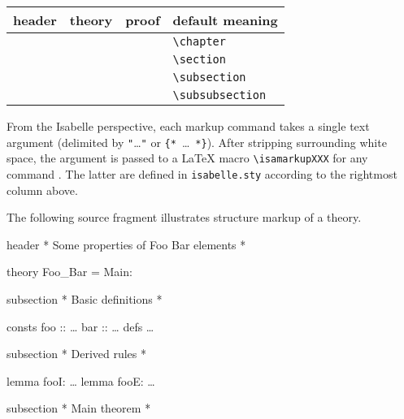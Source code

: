 \begin{isabellebody}
\begin{isamarkuptext}
  \begin{tabular}{llll}
  header & theory & proof & default meaning \\\hline
    & \commdx{chapter} & & \verb,\chapter, \\
  \commdx{header} & \commdx{section} & \commdx{sect} & \verb,\section, \\
    & \commdx{subsection} & \commdx{subsect} & \verb,\subsection, \\
    & \commdx{subsubsection} & \commdx{subsubsect} & \verb,\subsubsection, \\
  \end{tabular}

  \medskip

  From the Isabelle perspective, each markup command takes a single
  text argument (delimited by \verb,",\dots\verb,", or
  \verb,{,\verb,*,~\dots~\verb,*,\verb,},).  After stripping
  surrounding white space, the argument is passed to a {\LaTeX} macro
  \verb,\isamarkupXXX, for any command .  The latter
  are defined in \verb,isabelle.sty, according to the rightmost column
  above.

  \medskip The following source fragment illustrates structure markup
  of a theory.

  \begin{ttbox}
  header {\ttlbrace}* Some properties of Foo Bar elements *{\ttrbrace}

  theory Foo_Bar = Main:

  subsection {\ttlbrace}* Basic definitions *{\ttrbrace}

  consts
    foo :: \dots
    bar :: \dots
  defs \dots
    
  subsection {\ttlbrace}* Derived rules *{\ttrbrace}

  lemma fooI: \dots
  lemma fooE: \dots

  subsection {\ttlbrace}* Main theorem *{\ttrbrace}


\end{ttbox}
\end{isamarkuptext}
\end{isabellebody}
